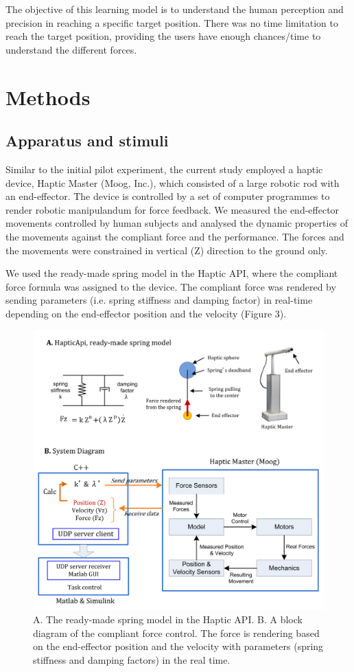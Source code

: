The objective of this learning model is to understand the human perception and precision in reaching a specific target position. There was no time limitation to reach the target position, providing the users have enough chances/time to understand the different forces. 

\section{Methods}

\subsection{Apparatus and stimuli}
Similar to the initial pilot experiment, the current study employed a haptic device, Haptic Master (Moog, Inc.), which consisted of a large robotic rod with an end-effector. The device is controlled by a set of computer programmes to render robotic manipulandum for force feedback. We measured the end-effector movements controlled by human subjects and analysed the dynamic properties of the movements against the compliant force and the performance. The forces and the movements were constrained in vertical (Z) direction to the ground only.

We used the ready-made spring model in the Haptic API, where the compliant force formula was assigned to the device. The compliant force was rendered by sending parameters (i.e. spring stiffness and damping factor) in real-time depending on the end-effector position and the velocity (Figure 3).

%
\begin{figure}
  \centering
  \includegraphics[scale=0.5]{Chie/figs/Figure3.png}
  \caption{A. The ready-made spring model in the Haptic API. B. A block diagram of the compliant force control. The force is rendering based on the end-effector position and the velocity with parameters (spring stiffness and damping factors) in the real time.}
  \label{modelling}
\end{figure}

